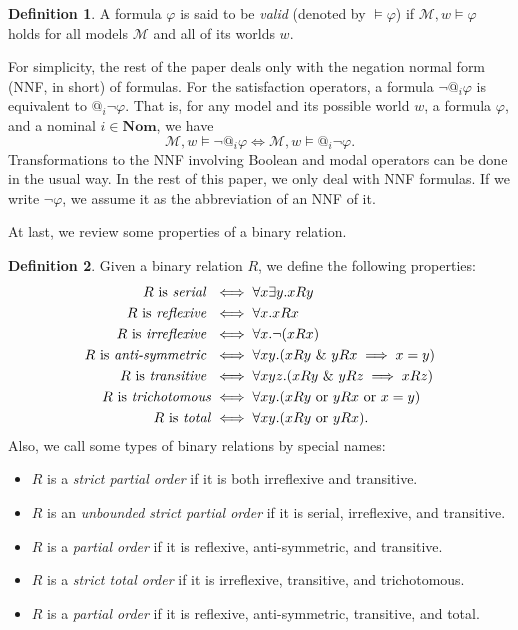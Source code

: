\documentclass{article}
\theoremstyle{definition}
\newtheorem{definition}{Definition}[section]
\newcommand{\Nom}{\mathbf{Nom}}
\newcommand{\Kmodel}{\mathcal{M}}
\begin{document}
\begin{definition}
    A formula $\varphi$ is said to be \emph{valid} (denoted by $\models \varphi$) if $\Kmodel, w \models \varphi$ holds for all models $\Kmodel$ and all of its worlds $w$.
    \label{defvalid}
\end{definition}

For simplicity, the rest of the paper deals only with the negation normal form (NNF, in short) of formulas. For the satisfaction operators, a formula $\neg @_i \varphi$ is equivalent to $@_i \neg \varphi$. That is, for any model and its possible world $w$, a formula $\varphi$, and a nominal $i \in \Nom$, we have
\[
    \Kmodel, w \models \neg @_i \varphi \iff \Kmodel, w \models @_i \neg \varphi .
\]
Transformations to the NNF involving Boolean and modal operators can be done in the usual way. In the rest of this paper, we only deal with NNF formulas. If we write $\neg \varphi$, we assume it as the abbreviation of an NNF of it.

At last, we review some properties of a binary relation.
\begin{definition}
    Given a binary relation $R$, we define the following properties:
    \begin{align*}
        R \text{ is \emph{serial} } &\iff \forall x \exists y. x R y \\
        R \text{ is \emph{reflexive} } &\iff \forall x. x R x \\
        R \text{ is \emph{irreflexive} } &\iff \forall x. \neg (x R x) \\
        R \text{ is \emph{anti-symmetric} } &\iff \forall x y. (x R y \ \& \ y R x \implies x = y) \\
        R \text{ is \emph{transitive} } &\iff \forall x y z. (x R y \ \& \ y R z \implies x R z) \\
        R \text{ is \emph{trichotomous}} &\iff \forall x y. (x R y \text{ or } y R x \text{ or } x = y) \\
        R \text{ is \emph{total}} &\iff \forall x y. (x R y \text{ or } y R x). 
    \end{align*}
    Also, we call some types of binary relations by special names:
    \begin{itemize}
        \item $R$ is a \emph{strict partial order} if it is both irreflexive and transitive.
        \item $R$ is an \emph{unbounded strict partial order} if it is serial, irreflexive, and transitive.
        \item $R$ is a \emph{partial order} if it is reflexive, anti-symmetric, and transitive.
        \item $R$ is a \emph{strict total order} if it is irreflexive, transitive, and trichotomous.
        \item $R$ is a \emph{partial order} if it is reflexive, anti-symmetric, transitive, and total.
    \end{itemize}
\end{definition}
\end{document}
